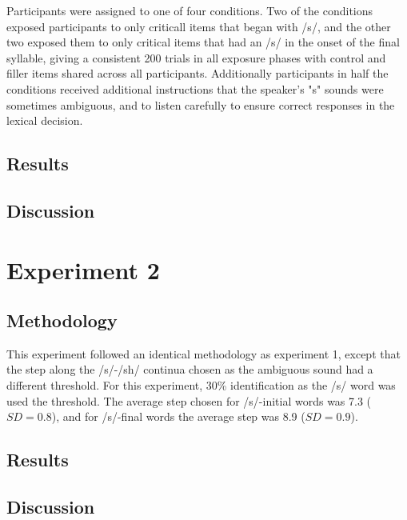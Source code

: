 Participants were assigned to one of four conditions.  Two of the conditions exposed participants to only criticall items that began with /s/, and the other two exposed them to only critical items that had an /s/ in the onset of the final syllable, giving a consistent 200 trials in all exposure phases with control and filler items shared across all participants.  Additionally participants in half the conditions received additional instructions that the speaker's "s" sounds were sometimes ambiguous, and to listen carefully to ensure correct responses in the lexical decision.

\subsection{Results}

\subsection{Discussion}

\section{Experiment 2}

\subsection{Methodology}

This experiment followed an identical methodology as experiment 1, except that the step along the /s/-/sh/ continua chosen as the ambiguous sound had a different threshold.  For this experiment, 30\% identification as the /s/ word was used the threshold. The average step chosen for /s/-initial words was 7.3 ($SD = 0.8$), and for /s/-final words the average step was 8.9 ($SD = 0.9$).

\subsection{Results}

\subsection{Discussion}